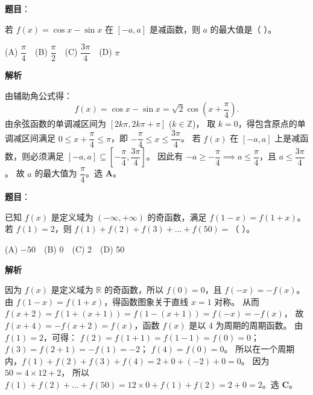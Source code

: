 \begin{answer}

\textbf{题目}：

若 $f(x)=\cos x-\sin x$ 在 $[-a,a]$ 是减函数，则 $a$ 的最大值是（ ）。

(A) $\dfrac\pi4$　(B) $\dfrac\pi2$　(C) $\dfrac{3\pi}{4}$　(D) $\pi$

\textbf{解析}

由辅助角公式得：
\nopagebreak[4]
\[f(x) = \cos x - \sin x = \sqrt2\cos\left(x+\dfrac\pi4\right).\]
由余弦函数的单调减区间为 $[2k\pi, 2k\pi+\pi]$ ($k\in\mathbb Z$)，
取 $k=0$，得包含原点的单调减区间满足 $0 \leqslant x+\dfrac\pi4 \leqslant \pi$，即 $-\dfrac\pi4 \leqslant x \leqslant \dfrac{3\pi}{4}$。
若 $f(x)$ 在 $[-a, a]$ 上是减函数，则必须满足 $[-a, a]\subseteq \left[-\dfrac\pi4, \dfrac{3\pi}{4}\right]$。
因此有 $-a \geqslant -\dfrac\pi4 \implies a \leqslant \dfrac\pi4$，且 $a \leqslant \dfrac{3\pi}{4}$。
故 $a$ 的最大值为 $\dfrac\pi4$。选 \textbf{A}。


\end{answer}
\begin{answer}

\textbf{题目}：

已知 $f(x)$ 是定义域为 $(-\infty,+\infty)$ 的奇函数，满足 $f(1-x)=f(1+x)$。若 $f(1)=2$，则 $f(1)+f(2)+f(3)+\dots+f(50)=$（ ）。

(A) $-50$　(B) 0　(C) 2　(D) 50

\textbf{解析}

因为 $f(x)$ 是定义域为 $\mathbb R$ 的奇函数，所以 $f(0)=0$，且 $f(-x)=-f(x)$。
由 $f(1-x) = f(1+x)$，得函数图象关于直线 $x=1$ 对称。
从而 $f(x+2) = f(1+(x+1)) = f(1-(x+1)) = f(-x) = -f(x)$，
故 $f(x+4) = -f(x+2) = f(x)$，函数 $f(x)$ 是以 4 为周期的周期函数。
由 $f(1)=2$，可得：
$f(2) = f(1+1) = f(1-1) = f(0) = 0$；
$f(3) = f(2+1) = -f(1) = -2$；
$f(4) = f(0) = 0$。
所以在一个周期内，$f(1)+f(2)+f(3)+f(4) = 2+0+(-2)+0 = 0$。
因为 $50 = 4\times 12 + 2$，
所以 $f(1)+f(2)+\dots+f(50) = 12\times 0 + f(1) + f(2) = 2 + 0 = 2$。选 \textbf{C}。


\end{answer}
